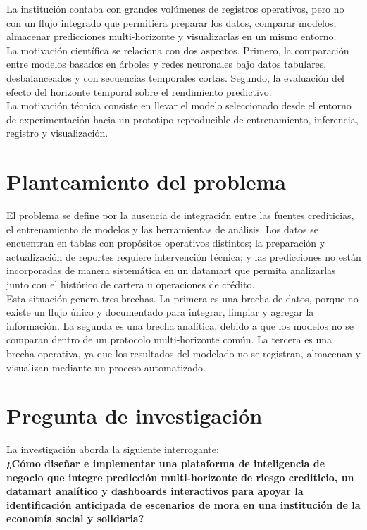 La institución contaba con grandes volúmenes de registros operativos, pero no con un flujo integrado que permitiera preparar los datos, comparar modelos, almacenar predicciones multi-horizonte y visualizarlas en un mismo entorno.\\

La motivación científica se relaciona con dos aspectos. Primero, la comparación entre modelos basados en árboles y redes neuronales bajo datos tabulares, desbalanceados y con secuencias temporales cortas. Segundo, la evaluación del efecto del horizonte temporal sobre el rendimiento predictivo.\\

La motivación técnica consiste en llevar el modelo seleccionado desde el entorno de experimentación hacia un prototipo reproducible de entrenamiento, inferencia, registro y visualización.

\section{Planteamiento del problema}

El problema se define por la ausencia de integración entre las fuentes crediticias, el entrenamiento de modelos y las herramientas de análisis. Los datos se encuentran en tablas con propósitos operativos distintos; la preparación y actualización de reportes requiere intervención técnica; y las predicciones no están incorporadas de manera sistemática en un datamart que permita analizarlas junto con el histórico de cartera u operaciones de crédito.\\

Esta situación genera tres brechas. La primera es una brecha de datos, porque no existe un flujo único y documentado para integrar, limpiar y agregar la información. La segunda es una brecha analítica, debido a que los modelos no se comparan dentro de un protocolo multi-horizonte común. La tercera es una brecha operativa, ya que los resultados del modelado no se registran, almacenan y visualizan mediante un proceso automatizado.

\section{Pregunta de investigación}

La investigación aborda la siguiente interrogante:\\

\textbf{¿Cómo diseñar e implementar una plataforma de inteligencia de negocio que integre predicción multi-horizonte de riesgo crediticio, un datamart analítico y dashboards interactivos para apoyar la identificación anticipada de escenarios de mora en una institución de la economía social y solidaria?}\\

